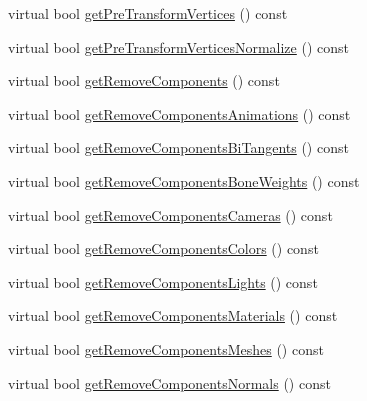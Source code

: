 \begin{DoxyCompactItemize}
\item 
virtual bool \hyperlink{classrepo_1_1manipulator_1_1modelconvertor_1_1_model_import_config_a47cb364503eb52629f4c1ee5d5570c26}{get\+Pre\+Transform\+Vertices} () const 
\item 
virtual bool \hyperlink{classrepo_1_1manipulator_1_1modelconvertor_1_1_model_import_config_a3e52a8dc5fa531c35a7997f5499a9cd5}{get\+Pre\+Transform\+Vertices\+Normalize} () const 
\item 
virtual bool \hyperlink{classrepo_1_1manipulator_1_1modelconvertor_1_1_model_import_config_a358ca62515e827b393469da01aae1907}{get\+Remove\+Components} () const 
\item 
virtual bool \hyperlink{classrepo_1_1manipulator_1_1modelconvertor_1_1_model_import_config_acbadab83f14e2b6cb988ae7291813e5d}{get\+Remove\+Components\+Animations} () const 
\item 
virtual bool \hyperlink{classrepo_1_1manipulator_1_1modelconvertor_1_1_model_import_config_a90c71460b0985dc56f4d046eb3f6a9dd}{get\+Remove\+Components\+Bi\+Tangents} () const 
\item 
virtual bool \hyperlink{classrepo_1_1manipulator_1_1modelconvertor_1_1_model_import_config_ac518489da50adf4177bb684235fccda2}{get\+Remove\+Components\+Bone\+Weights} () const 
\item 
virtual bool \hyperlink{classrepo_1_1manipulator_1_1modelconvertor_1_1_model_import_config_a1f1173ef019bce5edfaa52de986e1c32}{get\+Remove\+Components\+Cameras} () const 
\item 
virtual bool \hyperlink{classrepo_1_1manipulator_1_1modelconvertor_1_1_model_import_config_a68b3189a1038fceb5b9f85adca7cea68}{get\+Remove\+Components\+Colors} () const 
\item 
virtual bool \hyperlink{classrepo_1_1manipulator_1_1modelconvertor_1_1_model_import_config_ab83c82e10b04b7d5a8c44c13587d7c86}{get\+Remove\+Components\+Lights} () const 
\item 
virtual bool \hyperlink{classrepo_1_1manipulator_1_1modelconvertor_1_1_model_import_config_ae40e06e6e33c0e6004aa3817cd2775df}{get\+Remove\+Components\+Materials} () const 
\item 
virtual bool \hyperlink{classrepo_1_1manipulator_1_1modelconvertor_1_1_model_import_config_a4b8206abd580c42a1351ffd706d4554f}{get\+Remove\+Components\+Meshes} () const 
\item 
virtual bool \hyperlink{classrepo_1_1manipulator_1_1modelconvertor_1_1_model_import_config_a87395abe2a643c66e4dfe3766086d734}{get\+Remove\+Components\+Normals} () const 

\end{DoxyCompactItemize}
